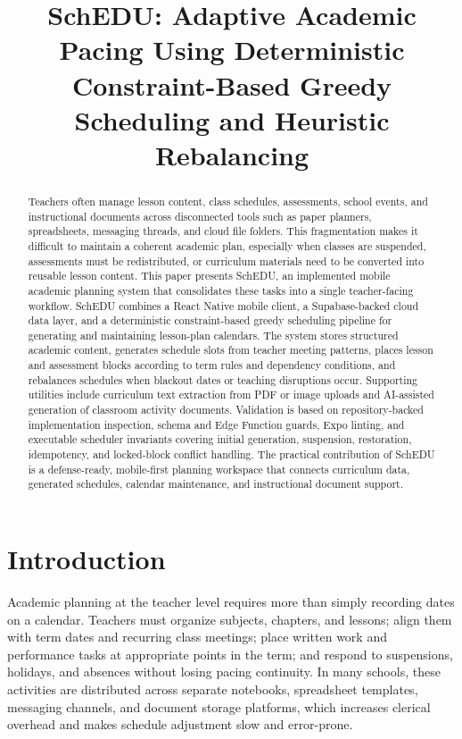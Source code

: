 \documentclass[conference]{IEEEtran}
\title{SchEDU: Adaptive Academic Pacing Using Deterministic Constraint-Based Greedy Scheduling and Heuristic Rebalancing}
\author{
\IEEEauthorblockN{Aundreka Clarinze Perez, Marjinel Abante, Leo Franklin Borromeo}
\IEEEauthorblockA{
College of Information Technology and Computer Science\\
Lyceum of the Philippines University -- Cavite\\
Cavite, Philippines\\
\{perez.aundreka, abante.marjinel, borromeo.leofranklin\}@lpu.edu.ph
}
}
\begin{document}
\maketitle

\begin{abstract}
Teachers often manage lesson content, class schedules, assessments, school events,
and instructional documents across disconnected tools such as paper planners,
spreadsheets, messaging threads, and cloud file folders. This fragmentation makes
it difficult to maintain a coherent academic plan, especially when classes are
suspended, assessments must be redistributed, or curriculum materials need to be
converted into reusable lesson content. This paper presents SchEDU, an implemented
mobile academic planning system that consolidates these tasks into a single
teacher-facing workflow. SchEDU combines a React Native mobile client, a
Supabase-backed cloud data layer, and a deterministic constraint-based greedy
scheduling pipeline for generating and maintaining lesson-plan calendars. The
system stores structured academic content, generates schedule slots from teacher
meeting patterns, places lesson and assessment blocks according to term rules and
dependency conditions, and rebalances schedules when blackout dates or teaching
disruptions occur. Supporting utilities include curriculum text extraction from
PDF or image uploads and AI-assisted generation of classroom activity documents.
Validation is based on repository-backed implementation inspection, schema and
Edge Function guards, Expo linting, and executable scheduler invariants covering
initial generation, suspension, restoration, idempotency, and locked-block conflict
handling. The practical contribution of SchEDU is a defense-ready, mobile-first
planning workspace that connects curriculum data, generated schedules, calendar
maintenance, and instructional document support.
\end{abstract}

\section{Introduction}

Academic planning at the teacher level requires more than simply recording dates on
a calendar. Teachers must organize subjects, chapters, and lessons; align them with
term dates and recurring class meetings; place written work and performance tasks at
appropriate points in the term; and respond to suspensions, holidays, and absences
without losing pacing continuity. In many schools, these activities are distributed
across separate notebooks, spreadsheet templates, messaging channels, and document
storage platforms, which increases clerical overhead and makes schedule adjustment
slow and error-prone.
\end{document}
